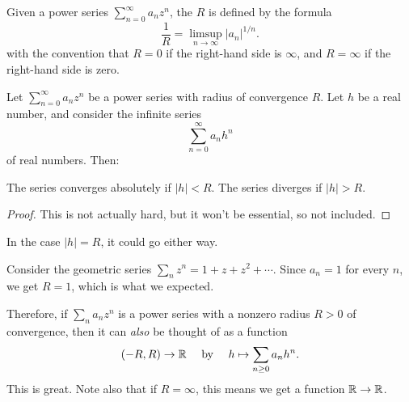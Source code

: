 \begin{definition}
	Given a power series $\sum_{n=0}^{\infty} a_n z^n$,
	the  $R$ is defined
	by the formula
	\[ \frac 1R = \limsup_{n \to \infty} \left\lvert a_n \right\rvert^{1/n}. \]
	with the convention that $R = 0$ if the right-hand side is $\infty$,
	and $R = \infty$ if the right-hand side is zero.
\end{definition}
\begin{theorem}
	Let $\sum_{n=0}^{\infty} a_n z^n$ be a power series with radius of convergence $R$.
	Let $h$ be a real number, and consider the infinite series
	\[ \sum_{n=0}^\infty a_n h^n \]
	of real numbers.
	Then:
	\begin{itemize}
		\ii The series converges absolutely if $|h| < R$.
		\ii The series diverges if $|h| > R$.
	\end{itemize}
\end{theorem}
\begin{proof}
	This is not actually hard,
	but it won't be essential, so not included.
\end{proof}
\begin{remark}
	In the case $|h| = R$, it could go either way.
\end{remark}
\begin{example}
	Consider the geometric series $\sum_{n} z^n = 1 + z + z^2 + \cdots$.
	Since $a_n = 1$ for every $n$, we get $R = 1$,
	which is what we expected.
\end{example}

Therefore, if $\sum_n a_n z^n$ is a power
series with a nonzero radius $R > 0$ of convergence,
then it can \emph{also} be thought of as a function
\[ (-R, R) \to \mathbb R
	\quad\text{ by }\quad
	h \mapsto \sum_{n \ge 0} a_n h^n. \]
This is great.
Note also that if $R = \infty$,
this means we get a function $\mathbb R \to \mathbb R$.

